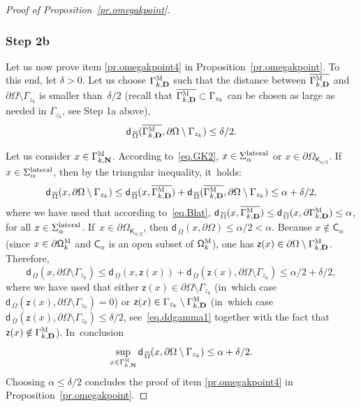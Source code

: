 \documentclass[JEP,XML,SOM,Unicode,NoEqCountersInSection,NoFloatCountersInSection,published]{cedram}
\newcommand{\mbf}[1]{\mathbf{#1}}
\let\pa\partial
\theoremstyle{plain}
\theoremstyle{definition}
\begin{document}
\begin{proof}[Proof of Proposition~\ref{pr.omegakpoint}]
\subsubsection*{Step 2b}
Let us now prove item \eqref{pr.omegakpoint4} in Proposition~\ref{pr.omegakpoint}. To this end, let $\delta>0$. Let us choose $\Gamma_{k,\mbf D}^{\textsc{M}} $ such that the distance between $ \overline{\Gamma_{k,\mbf D}^{\textsc{M}} }$ and $\partial \Omega \setminus \Gamma_{z_k}$ is smaller than~$\delta/2$ (recall that $\overline{ \Gamma_{k,\mbf D}^{\textsc{M}} }\subset \Gamma_{z_k}$ can be chosen as large as needed in $\Gamma_{z_k}$, see Step 1a above),~\ie
\begin{equation}\label{eq.ddgamma1}
\mathsf d_{\, \overline \Omega}(\overline{\Gamma_{k,\mbf D}^{\textsc{M}} }, \partial \Omega \setminus \Gamma_{z_k})\le \delta/2.
\end{equation}

Let us consider $x\in \Gamma_{k,\mbf N}^{\textsc{M}}$. According to~\eqref{eq.GK2}, $x\in \Sigma_\alpha^{\textup{lateral}}$ or $x\in \partial \Omega_{\mathsf K_{\alpha/2}}$. If~$x\in \Sigma_\alpha^{\textup{lateral}}$, then by the triangular inequality, it~holds:
\[
\mathsf d_{\, \overline \Omega}(x, \partial \Omega \setminus \Gamma_{z_k}) \le \mathsf d_{\, \overline \Omega}(x, \overline{\Gamma_{k,\mbf D}^{\textsc{M}} }) +\mathsf d_{\, \overline \Omega}(\overline{\Gamma_{k,\mbf D}^{\textsc{M}} }, \partial \Omega \setminus \Gamma_{z_k})\le \alpha+\delta/2,
\]
where we have used that according to~\eqref{eq.Blat}, $\mathsf d_{\, \overline \Omega}(x, \overline{\Gamma_{k,\mbf D}^{\textsc{M}} })\le \mathsf d_{\, \overline \Omega}(x, \pa{\Gamma_{k,\mbf D}^{\textsc{M}} })\le \alpha$, for all $x\in \Sigma_\alpha^{\textup{lateral}}$. If~$x\in \partial \Omega_{\mathsf K_{\alpha/2}} $, then $ \mathsf d_{\, \overline \Omega}(x,\partial \Omega)\le \alpha/2<\alpha$.
Because $x\notin \mathsf C_\alpha$ (since $x\in \pa \mathsf \Omega_k^{\textsc{M}}$ and $\mathsf C_\alpha$ is an open subset of $\mathsf \Omega_k^{\textsc{M}}$), one has $\mathsf z(x)\in \partial \Omega\setminus \Gamma_{k,\mbf D}^{\textsc{M}} $. Therefore,
\[
\mathsf d_{\, \overline \Omega}(x, \partial \Omega \setminus \Gamma_{z_k})\le \mathsf d_{\, \overline \Omega}(x,\mathsf z(x))+\mathsf d_{\, \overline \Omega}(\mathsf z(x),\partial \Omega \setminus \Gamma_{z_k})\le \alpha/2 + \delta/2,
\]
where we have used that either $\mathsf z(x)\in \partial \Omega\setminus \Gamma_{z_k}$ (in~which case $\mathsf d_{\, \overline \Omega}(\mathsf z(x),\partial \Omega \setminus \Gamma_{z_k})=0$) or $\mathsf z(x)\in \Gamma_{z_k}\setminus \Gamma_{k,\mbf D}^{\textsc{M}} $ (in~which case $\mathsf d_{\, \overline \Omega}(\mathsf z(x),\partial \Omega \setminus \Gamma_{z_k})\le \delta/2$, see~\eqref{eq.ddgamma1} together with the fact that $\mathsf z(x)\notin \Gamma_{k,\mbf D}^{\textsc{M}} $). In~conclusion
\[
\sup_{x\in \Gamma_{k,\mbf N}^{\textsc{M}}}\mathsf d_{\, \overline \Omega}(x, \partial \Omega \setminus \Gamma_{z_k})\le \alpha+\delta/2.
\]
Choosing $\alpha\le \delta/2$ concludes the proof of item \eqref{pr.omegakpoint4} in Proposition~\ref{pr.omegakpoint}.


\end{proof}
\end{document}
